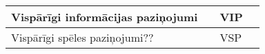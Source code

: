 \begin{tabularx}{\linewidth}{|p{2.5cm}|X|p{2.7cm}|X|}
	\setcounter{rownum}{0}
	\parbox{2.5cm}{Vispārīgi informācijas paziņojumi}        &                                                                                                                    & VIP\therownum &                                                    \\ \hline
	\setcounter{rownum}{0}
	\parbox{2.5cm}{Vispārīgi spēles paziņojumi??}            &                                                                                                                    & VSP\therownum &                                                    \\ \hline
\end{tabularx}
